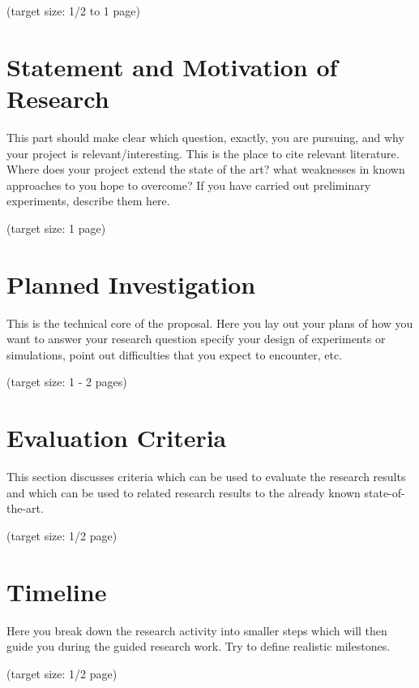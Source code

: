 \documentclass[a4paper,11pt,oneside]{article}
\begin{document}
  (target size: 1/2 to 1 page)

  \section{Statement and Motivation of Research}

  This part should make clear which question, exactly, you are
  pursuing, and why your project is relevant/interesting. This is the
  place to cite relevant literature. Where does your project extend
  the state of the art? what weaknesses in known approaches to you
  hope to overcome? If you have carried out preliminary experiments,
  describe them here.

  (target size: 1 page)

  \section{Planned Investigation}

  This is the technical core of the proposal. Here you lay out your
  plans of how you want to answer your research question specify your
  design of experiments or simulations, point out difficulties that
  you expect to encounter, etc.

  (target size: 1 - 2 pages)

  \section{Evaluation Criteria}

  This section discusses criteria which can be used to evaluate the
  research results and which can be used to related research results
  to the already known state-of-the-art.

  (target size: 1/2 page)

  \section{Timeline}

  Here you break down the research activity into smaller steps which
  will then guide you during the guided research work. Try to define
  realistic milestones.

  (target size: 1/2 page)

  \nocite{JS06}

  
  
\end{document}
